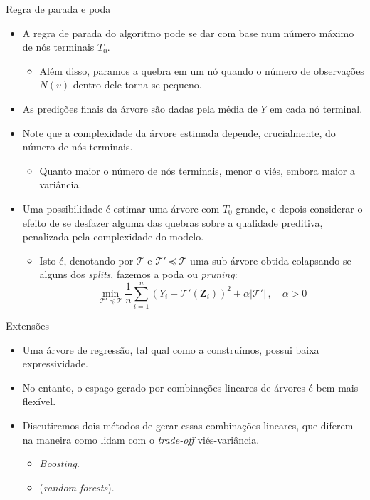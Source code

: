 \documentclass[11pt]{beamer}
\begin{document}
\begin{frame}{Regra de parada e poda}
	\begin{itemize}
		\item A regra de parada do algoritmo pode se dar com base num número máximo de nós terminais $T_0$.
		\begin{itemize}
			\item Além disso, paramos a quebra em um nó quando o número de observações $N(v)$ dentro dele torna-se pequeno.
		\end{itemize}
		\item As predições finais da árvore são dadas pela média de $Y$ em cada nó terminal.
		\item Note que a complexidade da árvore estimada depende, crucialmente, do número de nós terminais.
		\begin{itemize}
			\item Quanto maior o número de nós terminais, menor o viés, embora maior a variância.
		\end{itemize}
		\item Uma possibilidade é estimar uma árvore com $T_0$ grande, e depois considerar o efeito de se desfazer alguma das quebras sobre a qualidade preditiva, {\color{blue}penalizada} pela complexidade do modelo.
		\begin{itemize}
			\item Isto é, denotando por $\mathcal{T}$ e $\mathcal{T}' \preceq \mathcal{T}$ uma sub-árvore obtida colapsando-se  alguns dos \textit{splits}, fazemos a poda ou \textit{pruning}:
			$$\min_{\mathcal{T}' \preceq  \mathcal{T}} \frac{1}{n} \sum_{i=1}^n(Y_i - \mathcal{T}'(\boldsymbol{Z}_i))^2 + \alpha |\mathcal{T}'|\, ,\quad \alpha > 0$$
		\end{itemize}
		 
	\end{itemize}
\end{frame}


\begin{frame}{Extensões}
	\begin{itemize}
		\item Uma árvore de regressão, tal qual como a construímos, possui baixa expressividade.
		\item No entanto, o espaço gerado por combinações lineares de árvores é bem mais flexível.
		\item Discutiremos dois métodos de gerar essas combinações lineares, que diferem na maneira como lidam com o \textit{trade-off }viés-variância.
		\begin{itemize}
			\item \textit{Boosting}.
			\item {} (\textit{random forests}).
		\end{itemize}
	\end{itemize}
\end{frame}
\end{document}
